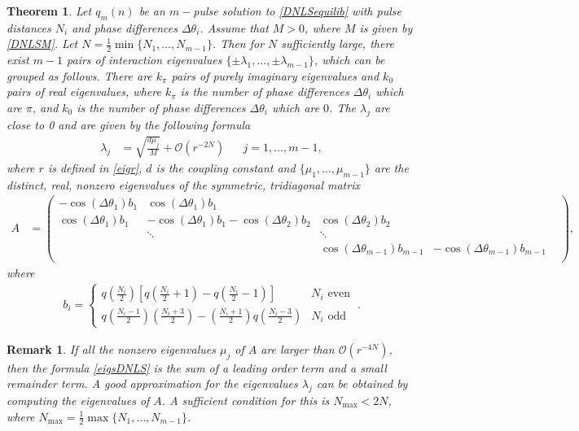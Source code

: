 \documentclass[12pt]{elsarticle}
\newtheorem{theorem}{Theorem}
\newtheorem{remark}{Remark}
\begin{document}
\begin{theorem}\label{DNLSeigtheorem}
Let $q_m(n)$ be an $m-$pulse solution to \cref{DNLSequilib} with pulse distances $N_i$ and phase differences $\Delta\theta_i$. Assume that $M > 0$, where $M$ is given by \eqref{DNLSM}. Let $N = \frac{1}{2} \min\{ N_1, \dots, N_{m-1}\}$. Then for $N$ sufficiently large, there exist $m-1$ pairs of interaction eigenvalues $\{\pm \lambda_1, \dots, \pm \lambda_{m-1}\}$, which can be grouped as follows. There are $k_\pi$ pairs of purely imaginary eigenvalues and $k_0$ pairs of real eigenvalues, where $k_\pi$ is the number of phase differences $\Delta\theta_i$ which are $\pi$, and $k_0$ is the number of phase differences $\Delta\theta_i$ which are $0$. The $\lambda_j$ are close to 0 and are given by the following formula
\begin{align}\label{eigsDNLS}
\lambda_j &= \sqrt{\frac{d \mu_j}{M}} + \mathcal{O}(r^{-2N}) && j = 1, \dots, m-1,
\end{align}
where $r$ is defined in \cref{eigr}, $d$ is the coupling constant and $\{ \mu_1, \dots, \mu_{m-1} \}$ are the distinct, real, nonzero eigenvalues of the symmetric, tridiagonal matrix
\begin{align}\label{DNLSmatrixA}
A &= \begin{pmatrix}
-\cos(\Delta\theta_1) b_1 & \cos(\Delta\theta_1) b_1 & & &  \\
\cos(\Delta\theta_1) b_1 & -\cos(\Delta\theta_1) b_1 - \cos(\Delta\theta_2) b_2 & \cos(\Delta\theta_2) b_2 \\
& \ddots & \ddots \\
& &  \cos(\Delta\theta_{m-1}) b_{m-1} & -\cos(\Delta\theta_{m-1}) b_{m-1}  \\
\end{pmatrix},
\end{align}
where
\begin{align}\label{bieq}
b_i = \begin{cases}
q\left(\frac{N_i}{2}\right) \left[ q\left(\frac{N_i}{2} + 1\right) - q\left(\frac{N_i}{2} - 1\right) \right] & N_i \text{ even} \\
q\left(\frac{N_i-1}{2}\right)\left(\frac{N_i+3}{2}\right) 
- \left(\frac{N_i+1}{2}\right)q\left(\frac{N_i-3}{2}\right) & N_i \text{ odd}
\end{cases} \:.
\end{align}
\end{theorem}

\begin{remark}
If all the nonzero eigenvalues $\mu_j$ of $A$ are larger than $\mathcal{O}(r^{-4N})$, then the formula \cref{eigsDNLS} is the sum of a leading order term and a small remainder term. A good approximation for the eigenvalues $\lambda_j$ can be obtained by computing the eigenvalues of $A$. A sufficient condition for this is $N_{\mathrm{max}} < 2 N$, where $N_{\mathrm{max}} = \frac{1}{2} \max\{ N_1, \dots, N_{m-1}\}$.
\end{remark}
\end{document}
